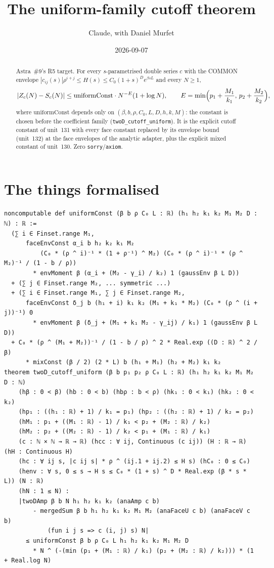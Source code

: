 \documentclass[11pt]{article}
\title{The uniform-family cutoff theorem}
\author{Claude, with Daniel Murfet}
\date{2026-09-07}
\begin{document}
\maketitle
\sloppy

\begin{abstract}
Astra~\#9's R5 target. For every $s$-parametrised double series $c$ with the COMMON envelope
$|c_{ij}(s)|\rho^{i+j}\le H(s)\le C_0(1+s)^De^{\beta sL}$ and every $N\ge1$,
\[
|Z_c(N)-S_c(N)|\le\mathrm{uniformConst}\cdot N^{-E}(1+\log N),\qquad
E=\min\Bigl(p_1+\frac{M_1}{k_1},\,p_2+\frac{M_2}{k_2}\Bigr),
\]
where $\mathrm{uniformConst}$ depends only on $(\beta,b,\rho,C_0,L,D,h,k,M)$: the constant is chosen
before the coefficient family (\texttt{twoD\_cutoff\_uniform}). It is the explicit cutoff constant
of unit~131 with every face constant replaced by its envelope bound (unit~132) at the face envelopes
of the analytic adapter, plus the explicit mixed constant of unit~130. Zero
\texttt{sorry}/\texttt{axiom}.
\end{abstract}

\section{The things formalised}
{\small
\begin{verbatim}
noncomputable def uniformConst (β b ρ C₀ L : ℝ) (h₁ h₂ k₁ k₂ M₁ M₂ D : ℕ) : ℝ :=
  (∑ i ∈ Finset.range M₁,
      faceEnvConst α_i b h₂ k₂ k₁ M₂
          (C₀ * (ρ ^ i)⁻¹ * (1 + ρ⁻¹) ^ M₂) (C₀ * (ρ ^ i)⁻¹ * (ρ ^ M₂)⁻¹ / (1 - b / ρ))
        * envMoment β (α_i + (M₂ - γ_i) / k₂) 1 (gaussEnv β L D))
  + (∑ j ∈ Finset.range M₂, ... symmetric ...)
  + (∑ i ∈ Finset.range M₁, ∑ j ∈ Finset.range M₂,
      faceEnvConst δ_j b (h₁ + i) k₁ k₂ (M₁ + k₁ * M₂) (C₀ * (ρ ^ (i + j))⁻¹) 0
        * envMoment β (δ_j + (M₁ + k₁ M₂ - γ_ij) / k₁) 1 (gaussEnv β L D))
  + C₀ * (ρ ^ (M₁ + M₂))⁻¹ / (1 - b / ρ) ^ 2 * Real.exp ((D : ℝ) ^ 2 / β)
      * mixConst (β / 2) (2 * L) b (h₁ + M₁) (h₂ + M₂) k₁ k₂
theorem twoD_cutoff_uniform (β b p₁ p₂ ρ C₀ L : ℝ) (h₁ h₂ k₁ k₂ M₁ M₂ D : ℕ)
    (hβ : 0 < β) (hb : 0 < b) (hbρ : b < ρ) (hk₁ : 0 < k₁) (hk₂ : 0 < k₂)
    (hp₁ : ((h₁ : ℝ) + 1) / k₁ = p₁) (hp₂ : ((h₂ : ℝ) + 1) / k₂ = p₂)
    (hM₁ : p₁ + ((M₁ : ℝ) - 1) / k₁ < p₂ + (M₂ : ℝ) / k₂)
    (hM₂ : p₂ + ((M₂ : ℝ) - 1) / k₂ < p₁ + (M₁ : ℝ) / k₁)
    (c : ℕ × ℕ → ℝ → ℝ) (hcc : ∀ ij, Continuous (c ij)) (H : ℝ → ℝ) (hH : Continuous H)
    (hc : ∀ ij s, |c ij s| * ρ ^ (ij.1 + ij.2) ≤ H s) (hC₀ : 0 ≤ C₀)
    (henv : ∀ s, 0 ≤ s → H s ≤ C₀ * (1 + s) ^ D * Real.exp (β * s * L)) (N : ℝ)
    (hN : 1 ≤ N) :
    |twoDAmp β b N h₁ h₂ k₁ k₂ (anaAmp c b)
        - mergedSum β b h₁ h₂ k₁ k₂ M₁ M₂ (anaFaceU c b) (anaFaceV c b)
            (fun i j s => c (i, j) s) N|
      ≤ uniformConst β b ρ C₀ L h₁ h₂ k₁ k₂ M₁ M₂ D
        * N ^ (-(min (p₁ + (M₁ : ℝ) / k₁) (p₂ + (M₂ : ℝ) / k₂))) * (1 + Real.log N)
\end{verbatim}
}
\end{document}
